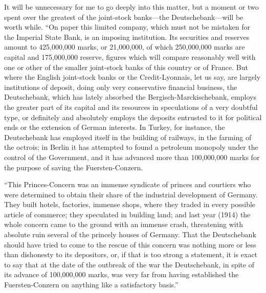 \documentclass{book}
\begin{document}
It will be unnecessary for me to go deeply into this matter, but a moment or two spent over the greatest of the joint-stock banks—the Deutschebank—will be worth while. “On paper this limited company, which must not be mistaken for the Imperial State Bank, is an imposing institution. Its securities and reserves amount to 425,000,000 marks, or 21,000,000, of which 250,000,000 marks are capital and 175,000,000 reserve, figures which will compare reasonably well with one or other of the smaller joint-stock banks of this country or of France. But where the English joint-stock banks or the Credit-Lyonnais, let us say, are largely institutions of deposit, doing only very conservative financial business, the Deutschebank, which has lately absorbed the Bergisch-Marckischebank, employs the greater part of its capital and its resources in speculations of a very doubtful type, or definitely and absolutely employs the deposits entrusted to it for political ends or the extension of German interests. In Turkey, for instance, the Deutschebank has employed itself in the building of railways, in the farming of the octrois; in Berlin it has attempted to found a petroleum monopoly under the control of the Government, and it has advanced more than 100,000,000 marks for the purpose of saving the Fuersten-Conzern.

“This Princes-Concern was an immense syndicate of princes and courtiers who were determined to obtain their share of the industrial development of Germany. They built hotels, factories, immense shops, where they traded in every possible article of commerce; they speculated in building land; and last year (1914) the whole concern came to the ground with an immense crash, threatening with absolute ruin several of the princely houses of Germany. That the Deutschebank should have tried to come to the rescue of this concern was nothing more or less than dishonesty to its depositors, or, if that is too strong a statement, it is exact to say that at the date of the outbreak of the war the Deutschebank, in spite of its advance of 100,000,000 marks, was very far from having established the Fuersten-Conzern on anything like a satisfactory basis.”\footnotemark[2]
\end{document}
